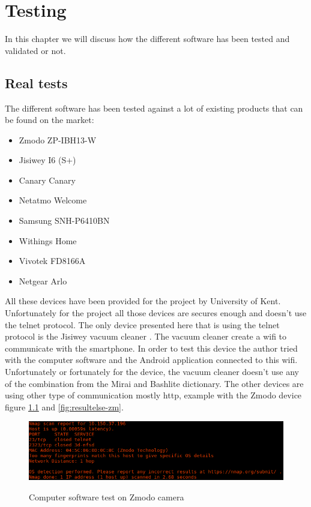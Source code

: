 \documentclass{report}
\begin{document}
\chapter{Testing}
In this chapter we will discuss how the different software has been tested and validated or not.

\section{Real tests}
The different software has been tested against a lot of existing products that can be found on the market:
\begin{itemize}
 \item Zmodo ZP-IBH13-W \autocite{zmodo}
 \item Jisiwey I6 (S+) \autocite{jisiwey}
 \item Canary Canary \autocite{canary}
 \item Netatmo Welcome \autocite{netatmo}
 \item Samsung SNH-P6410BN \autocite{samsung}
 \item Withings Home \autocite{withings}
 \item Vivotek FD8166A \autocite{vivotek}
 \item Netgear Arlo \autocite{netgear}
\end{itemize}
All these devices have been provided for the project by University of Kent. Unfortunately for the project all those devices are secures enough and doesn't use the telnet protocol. The only device presented here that is using the telnet protocol is the Jisiwey vacuum cleaner \autocite{jisiwey}.\newline
The vacuum cleaner create a wifi to communicate with the smartphone. In order to test this device the author tried with the computer software and the Android application connected to this wifi. Unfortunately or fortunately for the device, the vacuum cleaner doesn't use any of the combination from the Mirai and Bashlite dictionary.\newline
The other devices are using other type of communication mostly http, example with the Zmodo device figure \ref{fig:result-zm} and \ref{fig:resultelse-zm}.
\begin{figure}[h]
 \caption{Computer software test on Zmodo \protect\footnotemark camera}
 \centering
 \includegraphics[width=1.2\textwidth]{./img/exp/result}
 \label{fig:result-zm}
\end{figure}
\end{document}
